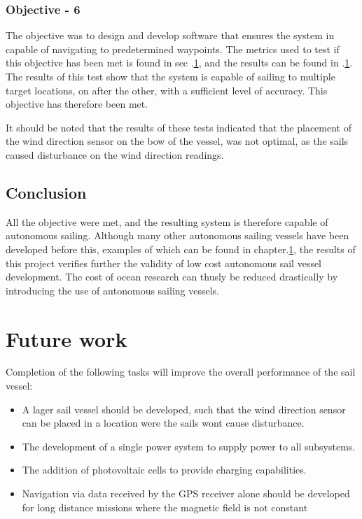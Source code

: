 \subsubsection{Objective - 6}
The objective was to design and develop software that ensures the system in capable of navigating to predetermined waypoints. The metrics used to test if this objective has been met is
found in sec .\ref{}, and the results can be found in .\ref{}. The results of this test show that the system is capable of sailing to multiple target locations, on after the other, with 
a sufficient level of accuracy. This objective has therefore been met. 

It should be noted that the results of these tests indicated that the placement of the wind direction sensor on the bow of the vessel, was not optimal, as 
the sails caused disturbance on the wind direction readings.

\subsection{Conclusion}
All the objective were met, and the resulting system is therefore capable of autonomous sailing. Although many other autonomous sailing vessels have been developed before this, examples of 
which can be found in chapter.\ref{}, the results of this project verifies further the validity of low cost autonomous sail vessel development. The cost of ocean research can thusly be reduced
drastically by introducing the use of autonomous sailing vessels.  

\section{Future work}
Completion of the following tasks will improve the overall performance of the sail vessel:
\begin{itemize}
    \item A lager sail vessel should be developed, such that the wind direction sensor can be placed in a location were the sails wont cause disturbance.
    \item The development of a single power system to supply power to all subsystems.
    \item The addition of photovoltaic cells to provide charging capabilities.
    \item Navigation via data received by the GPS receiver alone should be developed for long distance missions where the magnetic field is not constant   
\end{itemize}